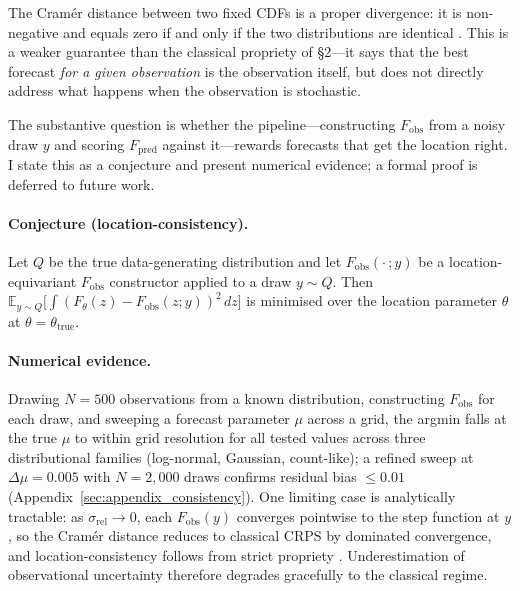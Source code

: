 The Cram\'er distance between two fixed CDFs is a proper divergence: it is non-negative and equals zero if and only if the two distributions are identical \citep{szekely2013energy,thorarinsdottir2013using}. This is a weaker guarantee than the classical propriety of \S2---it says that the best forecast \emph{for a given observation} is the observation itself, but does not directly address what happens when the observation is stochastic.

The substantive question is whether the pipeline---constructing $F_\text{obs}$ from a noisy draw $y$ and scoring $F_\text{pred}$ against it---rewards forecasts that get the location right. I state this as a conjecture and present numerical evidence; a formal proof is deferred to future work.

\paragraph{Conjecture (location-consistency).}
Let $Q$ be the true data-generating distribution and let $F_\text{obs}(\cdot\,; y)$ be a location-equivariant $F_\text{obs}$ constructor applied to a draw $y \sim Q$. Then
$\mathbb{E}_{y \sim Q}\bigl[\int (F_\theta(z) - F_\text{obs}(z; y))^2\,dz\bigr]$
is minimised over the location parameter $\theta$ at $\theta = \theta_\text{true}$.

\paragraph{Numerical evidence.}
Drawing $N = 500$ observations from a known distribution, constructing $F_\text{obs}$ for each draw, and sweeping a forecast parameter $\mu$ across a grid, the argmin falls at the true $\mu$ to within grid resolution for all tested values across three distributional families (log-normal, Gaussian, count-like); a refined sweep at $\Delta\mu = 0.005$ with $N = 2{,}000$ draws confirms residual bias $\leq 0.01$ (Appendix~\ref{sec:appendix_consistency}). One limiting case is analytically tractable: as $\sigma_\text{rel} \to 0$, each $F_\text{obs}(y)$ converges pointwise to the step function at $y$, so the Cram\'er distance reduces to classical CRPS by dominated convergence, and location-consistency follows from strict propriety \citep{gneiting2007strictly}. Underestimation of observational uncertainty therefore degrades gracefully to the classical regime.

